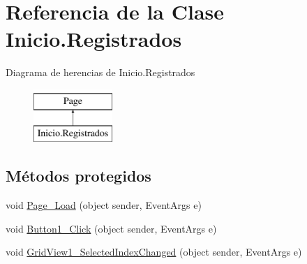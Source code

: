 \hypertarget{classInicio_1_1Registrados}{}\section{Referencia de la Clase Inicio.\+Registrados}
\label{classInicio_1_1Registrados}
Diagrama de herencias de Inicio.\+Registrados\begin{figure}[H]
\begin{center}
\leavevmode
\includegraphics[height=2.000000cm]{classInicio_1_1Registrados}
\end{center}
\end{figure}
\subsection*{Métodos protegidos}
\begin{DoxyCompactItemize}
\item 
void \mbox{\hyperlink{classInicio_1_1Registrados_abcd4568d8c98855d98174d384c597063}{Page\+\_\+\+Load}} (object sender, Event\+Args e)
\item 
void \mbox{\hyperlink{classInicio_1_1Registrados_a3f8a14965116a309bdfe026bf3d6d743}{Button1\+\_\+\+Click}} (object sender, Event\+Args e)
\item 
void \mbox{\hyperlink{classInicio_1_1Registrados_a92b0d0a8bd9eed0d89fe34bd2af00454}{Grid\+View1\+\_\+\+Selected\+Index\+Changed}} (object sender, Event\+Args e)
\end{DoxyCompactItemize}
